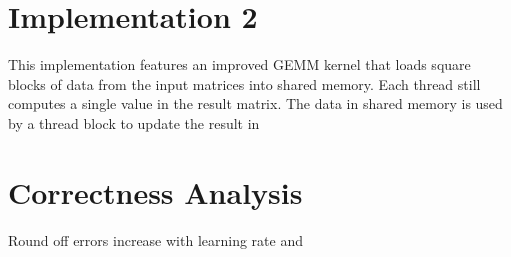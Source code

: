 \documentclass[12pt]{article}
\begin{document}
\section{Implementation 2}

This implementation features an improved GEMM kernel that loads square blocks of data from the input matrices into shared memory. Each thread still computes a single value in the result matrix. The data in shared memory is used by a thread block to update the result in 

\section{Correctness Analysis}

Round off errors increase with learning rate and 
\end{document}
